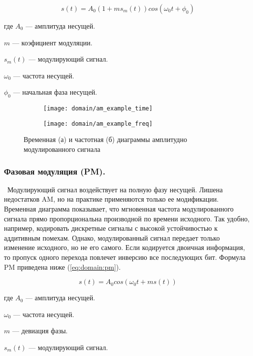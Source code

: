 \begin{equation}
  \label{eq:domain:am}
  s(t) = A_0 (1 + m s_m(t)) cos(\omega_0 t + \phi_0)
\end{equation}
\begin{explanation}
\item[где] $A_0$ --- амплитуда несущей.
\item $m$ --- коэфициент модуляции.
\item $s_m(t)$ --- модулирующий сигнал.
\item $\omega_0$ --- частота несущей.
\item $\phi_0$ --- начальная фаза несущей.
\end{explanation}

\begin{figure}[h]
  \centering
  \begin{subfigure}{0.45\textwidth}
    \texttt{[image: domain/am\_example\_time]}
    \caption{}
  \end{subfigure}
  \begin{subfigure}{0.45\textwidth}
    \texttt{[image: domain/am\_example\_freq]}
    \caption{}
  \end{subfigure}
  \caption{Временная (а) и частотная (б) диаграммы амплитудно модулированного сигнала}
  \label{fig:domain:am}
\end{figure}

\subsubsection{Фазовая модуляция (PM).}\ Модулирующий сигнал воздействует на полную фазу несущей. Лишена недостатков AM, но на практике применяются только ее модификации. Временная диаграмма показывает, что мгновенная частота модулированного сигнала прямо пропорциональна производной по времени исходного. Так удобно, например, кодировать дискретные сигналы с высокой устойчивостью к аддитивным помехам. Однако, модулированный сигнал передает только изменение исходного, но не его самого. Если кодируется двоичная информация, то пропуск одного перехода повлечет инверсию все последующих бит. Формула PM приведена ниже (\autoref{eq:domain:pm}).

\begin{equation}
  \label{eq:domain:pm}
  s(t) = A_0 cos(\omega_0 t + m s(t))
\end{equation}
\begin{explanation}
\item[где] $A_0$ --- амплитуда несущей.
\item $\omega_0$ --- частота несущей.
\item $m$ --- девиация фазы.
\item $s_m(t)$ --- модулирующий сигнал.
\end{explanation}

